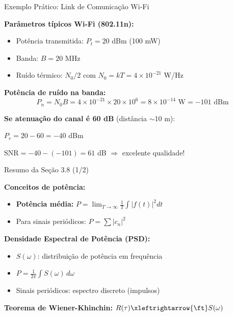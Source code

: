 
\begin{frame}{Exemplo Prático: Link de Comunicação Wi-Fi}

\textbf{Parâmetros típicos Wi-Fi (802.11n):}

\begin{itemize}
\item Potência transmitida: $P_t = 20$ dBm (100 mW)
\item Banda: $B = 20$ MHz
\item Ruído térmico: $N_0/2$ com $N_0 = kT = 4 \times 10^{-21}$ W/Hz
\end{itemize}

\textbf{Potência de ruído na banda:}
\[
P_n = N_0 B = 4 \times 10^{-21} \times 20 \times 10^6 = 8 \times 10^{-14} \text{ W} = -101 \text{ dBm}
\]

\textbf{Se atenuação do canal é 60 dB} (distância $\sim$10 m):

$P_r = 20 - 60 = -40$ dBm

$\text{SNR} = -40 - (-101) = 61$ dB $\Rightarrow$ excelente qualidade!

\end{frame}


\begin{frame}{Resumo da Seção 3.8 (1/2)}

\textbf{Conceitos de potência:}
\begin{itemize}
\item \textbf{Potência média:} $P = \lim_{T\to\infty} \frac{1}{T}\int |f(t)|^2 dt$
\item Para sinais periódicos: $P = \sum |c_n|^2$
\end{itemize}

\textbf{Densidade Espectral de Potência (PSD):}
\begin{itemize}
\item $S(\omega)$: distribuição de potência em frequência
\item $P = \frac{1}{2\pi}\int S(\omega)\, d\omega$
\item Sinais periódicos: espectro discreto (impulsos)
\end{itemize}

\textbf{Teorema de Wiener-Khinchin:} $R(\tau) \xleftrightarrow{\ft} S(\omega)$

\end{frame}


